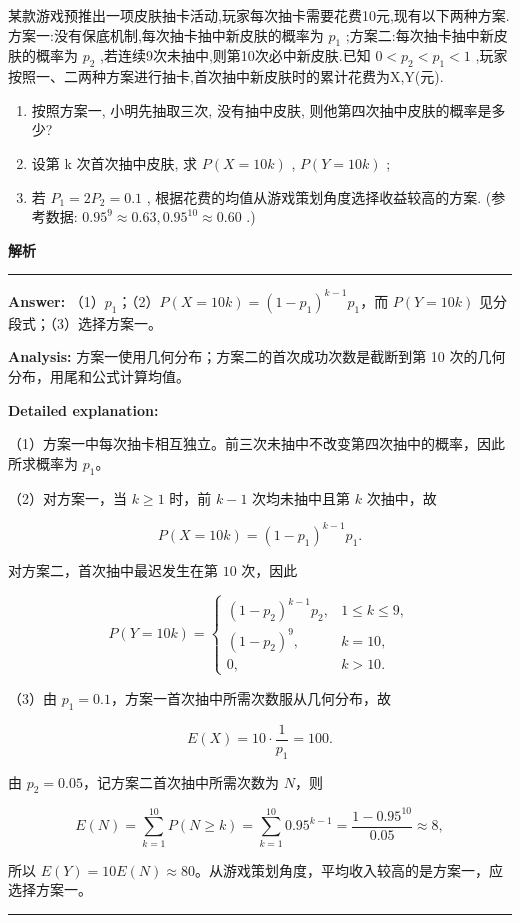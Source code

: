 \documentclass[UTF8,12pt,a4paper]{ctexart}
\renewcommand{\labelenumi}{\arabic{enumi}.}
\newenvironment{examSolutionBox}{%
  \par\medskip\begingroup
  \setlength{\leftskip}{1.0em}\setlength{\rightskip}{0.9em}%
  \noindent\textcolor{SolutionTeal}{\bfseries\large 解析}\par
  \smallskip\noindent\textcolor{SolutionRule}{\rule{\dimexpr\linewidth-\leftskip-\rightskip\relax}{0.8pt}}\par
  \smallskip\color{SolutionInk}%
}{%
  \par\smallskip\noindent\textcolor{SolutionRule}{\rule{\dimexpr\linewidth-\leftskip-\rightskip\relax}{0.8pt}}\par
  \endgroup\medskip
}
\begin{document}
某款游戏预推出一项皮肤抽卡活动,玩家每次抽卡需要花费10元,现有以下两种方案.方案一:没有保底机制,每次抽卡抽中新皮肤的概率为 \(p_{1}\) ;方案二:每次抽卡抽中新皮肤的概率为 \(p_{2}\) ,若连续9次未抽中,则第10次必中新皮肤.已知 \(0<p_{2}<p_{1}<1\) ,玩家按照一、二两种方案进行抽卡,首次抽中新皮肤时的累计花费为X,Y(元).

\begin{enumerate}
\def\labelenumi{(\arabic{enumi})}
\item
  按照方案一, 小明先抽取三次, 没有抽中皮肤, 则他第四次抽中皮肤的概率是多少?
\item
  设第 k 次首次抽中皮肤, 求 \(P(X=10k)\) , \(P(Y=10k)\) ;
\item
  若 \(P_{1} = 2P_{2} = 0.1\) , 根据花费的均值从游戏策划角度选择收益较高的方案. (参考数据: \(0.95^{9} \approx 0.63, 0.95^{10} \approx 0.60\) .)
\end{enumerate}

\begin{examSolutionBox}

\textbf{Answer:} （1）\(p_1\)；（2）\(P(X=10k)=(1-p_1)^{k-1}p_1\)，而 \(P(Y=10k)\) 见分段式；（3）选择方案一。

\textbf{Analysis:} 方案一使用几何分布；方案二的首次成功次数是截断到第 10 次的几何分布，用尾和公式计算均值。

\textbf{Detailed explanation:}

（1）方案一中每次抽卡相互独立。前三次未抽中不改变第四次抽中的概率，因此所求概率为 \(p_1\)。

（2）对方案一，当 \(k\ge1\) 时，前 \(k-1\) 次均未抽中且第 \(k\) 次抽中，故

\[
   P(X=10k)=(1-p_1)^{k-1}p_1.
   \]

对方案二，首次抽中最迟发生在第 \(10\) 次，因此

\[
   P(Y=10k)=
   \begin{cases}
   (1-p_2)^{k-1}p_2,&1\le k\le9,\\
   (1-p_2)^9,&k=10,\\
   0,&k>10.
   \end{cases}
   \]

（3）由 \(p_1=0.1\)，方案一首次抽中所需次数服从几何分布，故

\[
   E(X)=10\cdot\dfrac1{p_1}=100.
   \]

由 \(p_2=0.05\)，记方案二首次抽中所需次数为 \(N\)，则

\[
   E(N)=\sum_{k=1}^{10}P(N\ge k)
   =\sum_{k=1}^{10}0.95^{k-1}
   =\dfrac{1-0.95^{10}}{0.05}\approx8,
   \]

所以 \(E(Y)=10E(N)\approx80\)。从游戏策划角度，平均收入较高的是方案一，应选择方案一。

\end{examSolutionBox}
\end{document}
